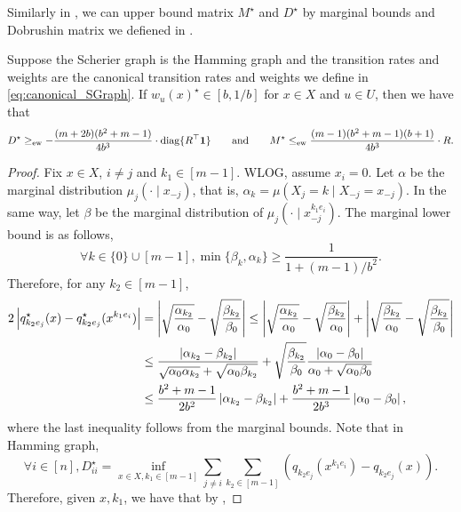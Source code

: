 Similarly in , we can upper bound matrix $M^\star$ and $D^\star$ by marginal bounds and Dobrushin matrix we defiened in .

\begin{lemma}\label{lem:hyper_grid_Dobrushin_to_AB_in_CSGE}
    Suppose the Scherier graph is the Hamming graph and the transition rates and weights are the canonical transition rates and weights we define in \eqref{eq:canonical_SGraph}.
    If $w_u(x)^\star \in [b,1/b]$ for $x\in X$ and $u\in U$, then
    we have that
    $$
        D^\star \geq_{\mathrm{ew}}-\frac{(m+2b)(b^2+m-1)}{4b^3}\cdot  \mathrm{diag}\{R^\top \boldsymbol{1}\}
        \qquad \text{and} \qquad M^\star \leq_{\mathrm{ew}}\frac{(m-1)(b^2+m-1)(b+1)}{4b^3} \cdot R .
    $$
\end{lemma}
\begin{proof}
    Fix $x\in X$, $i\neq j$ and $k_1\in [m-1]$.
    WLOG, assume $x_i = 0$.
    Let $\alpha$ be the marginal distribution $\mu_j(\cdot\mid x_{-j})$, that is, $\alpha_k = \mu(X_j = k\mid X_{-j}=x_{-j})$.
    In the same way, let $\beta$ be the marginal distribution of $\mu_j(\cdot\mid x_{-j}^{k_1 e_i})$.
    The marginal lower bound is as follows,
    $$
        \forall k\in \{0\}\cup [m-1], \min\{\beta_k,\alpha_k\} \geq \frac{1}{1 + (m-1)/b^2}.
    $$
    Therefore, for any $k_2\in [m-1]$,
    \begin{align}
        2\left\vert q_{k_2 e_j}^\star(x) - q_{k_2 e_j}^\star(x^{k_1 e_i})\right\vert
        &= \left\vert\sqrt{\frac{\alpha_{k_2}}{\alpha_0}} - \sqrt{\frac{\beta_{k_2}}{\beta_0}}\right\vert 
        \leq \left\vert\sqrt{\frac{\alpha_{k_2}}{\alpha_0}} - \sqrt{\frac{\beta_{k_2}}{\alpha_0}}\right\vert + \left\vert\sqrt{\frac{\beta_{k_2}}{\alpha_0}} - \sqrt{\frac{\beta_{k_2}}{\beta_0}}\right\vert \nonumber
        \\&\leq \frac{\left\vert\alpha_{k_2} - \beta_{k_2}\right\vert}{\sqrt{\alpha_{0}\alpha_{k_2}}+\sqrt{\alpha_0\beta_{k_2}}} + \sqrt{\frac{\beta_{k_2}}{\beta_0}}\frac{\left\vert\alpha_0 - \beta_0\right\vert}{\alpha_0 + \sqrt{\alpha_0\beta_0}} \nonumber
        \\&\leq \frac{b^2+m-1}{2b^2}\left\vert\alpha_{k_2} - \beta_{k_2}\right\vert + \frac{b^2+m-1}{2b^3}\left\vert\alpha_0 - \beta_0\right\vert , \label{eq:Dobrushin_upper_bound_AB}
    \end{align}
    where the last inequality follows from the marginal bounds.
    Note that in Hamming graph, 
    $$
        \forall i\in[n], D^\star_{ii} = \inf_{x\in X, k_1\in [m-1]} \sum_{j\neq i}\sum_{k_2\in [m-1]}(q_{k_2 e_j}(x^{k_1 e_i}) - q_{k_2 e_j}(x)).
    $$
    Therefore, given $x,k_1$, we have that by ,

\end{proof}
